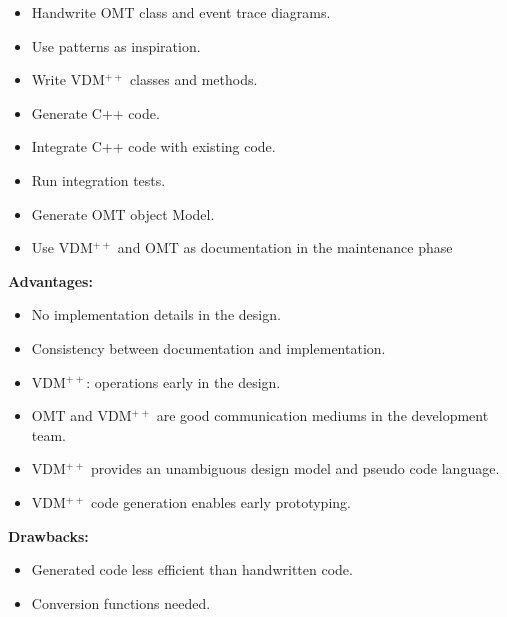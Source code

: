 \documentclass[dvips]{slides}
\newcommand{\vpp}{VDM$^{++}$}
\newcommand{\omt}[1]{\resizebox{\textwidth}{!}{\rotatebox{-90}{\texttt{[image: \#1]}}}}
\begin{document}
\begin{slide}{}

\begin{center}
\omt{errorstate.eps}
\end{center}
\end{slide}




\begin{slide}{}

\vspace{1cm}
\begin{itemize}
\item Handwrite OMT class and event trace diagrams.
\item Use patterns as inspiration.
\item Write \vpp{} classes and methods.
\item Generate C++ code.
\item Integrate C++ code with existing code.
\item Run integration tests.
\item Generate OMT object Model.
\item Use \vpp{} and OMT as documentation in the maintenance phase
\end{itemize}
\end{slide}


\begin{slide}{}

\vspace{1cm}
{\bf Advantages:}
\begin{itemize}
\item No implementation details in the design.
\item Consistency between documentation and implementation.
\item \vpp{}: operations early in the design.
\item OMT and \vpp{} are good communication mediums in the development
  team.
\item \vpp{} provides an unambiguous design model and pseudo code language.
\item \vpp{} code generation enables early prototyping.
\end{itemize}

{\bf Drawbacks:}
\begin{itemize}
\item Generated code less efficient than handwritten code.
\item Conversion functions needed.
\end{itemize}

\end{slide}
\end{document}
